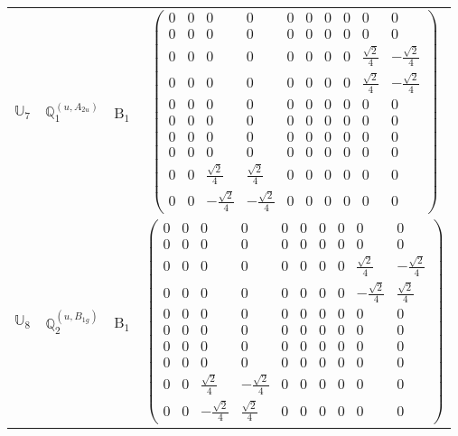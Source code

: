 \documentclass[fleqn,10pt,landscape]{article}
\begin{document}
\begin{itemize}
\begin{center}
\begin{longtable}{c|c|c|c}
$ \mathbb{U}_{7} $ & $\mathbb{Q}_{1}^{(u,A_{2u})}$ & B$_{1}$ & $\begin{pmatrix} 0 & 0 & 0 & 0 & 0 & 0 & 0 & 0 & 0 & 0 \\ 0 & 0 & 0 & 0 & 0 & 0 & 0 & 0 & 0 & 0 \\ 0 & 0 & 0 & 0 & 0 & 0 & 0 & 0 & \frac{\sqrt{2}}{4} & - \frac{\sqrt{2}}{4} \\ 0 & 0 & 0 & 0 & 0 & 0 & 0 & 0 & \frac{\sqrt{2}}{4} & - \frac{\sqrt{2}}{4} \\ 0 & 0 & 0 & 0 & 0 & 0 & 0 & 0 & 0 & 0 \\ 0 & 0 & 0 & 0 & 0 & 0 & 0 & 0 & 0 & 0 \\ 0 & 0 & 0 & 0 & 0 & 0 & 0 & 0 & 0 & 0 \\ 0 & 0 & 0 & 0 & 0 & 0 & 0 & 0 & 0 & 0 \\ 0 & 0 & \frac{\sqrt{2}}{4} & \frac{\sqrt{2}}{4} & 0 & 0 & 0 & 0 & 0 & 0 \\ 0 & 0 & - \frac{\sqrt{2}}{4} & - \frac{\sqrt{2}}{4} & 0 & 0 & 0 & 0 & 0 & 0 \end{pmatrix}$ \\
$ \mathbb{U}_{8} $ & $\mathbb{Q}_{2}^{(u,B_{1g})}$ & B$_{1}$ & $\begin{pmatrix} 0 & 0 & 0 & 0 & 0 & 0 & 0 & 0 & 0 & 0 \\ 0 & 0 & 0 & 0 & 0 & 0 & 0 & 0 & 0 & 0 \\ 0 & 0 & 0 & 0 & 0 & 0 & 0 & 0 & \frac{\sqrt{2}}{4} & - \frac{\sqrt{2}}{4} \\ 0 & 0 & 0 & 0 & 0 & 0 & 0 & 0 & - \frac{\sqrt{2}}{4} & \frac{\sqrt{2}}{4} \\ 0 & 0 & 0 & 0 & 0 & 0 & 0 & 0 & 0 & 0 \\ 0 & 0 & 0 & 0 & 0 & 0 & 0 & 0 & 0 & 0 \\ 0 & 0 & 0 & 0 & 0 & 0 & 0 & 0 & 0 & 0 \\ 0 & 0 & 0 & 0 & 0 & 0 & 0 & 0 & 0 & 0 \\ 0 & 0 & \frac{\sqrt{2}}{4} & - \frac{\sqrt{2}}{4} & 0 & 0 & 0 & 0 & 0 & 0 \\ 0 & 0 & - \frac{\sqrt{2}}{4} & \frac{\sqrt{2}}{4} & 0 & 0 & 0 & 0 & 0 & 0 \end{pmatrix}$ \\

\end{longtable}
\end{center}
\end{itemize}
\end{document}
